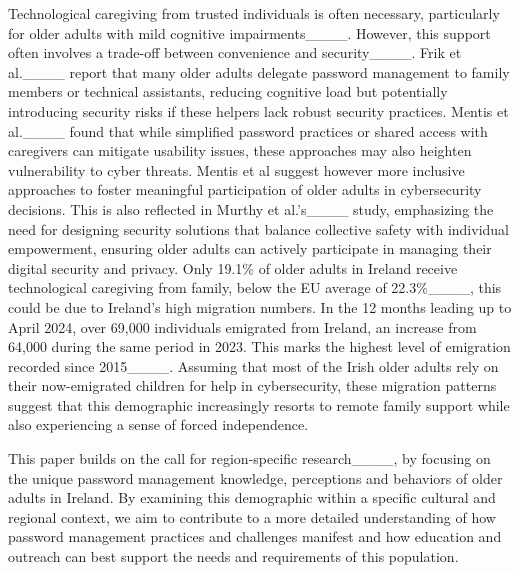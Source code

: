 Technological caregiving from trusted individuals is often necessary, particularly for older adults with mild cognitive impairments____. However, this support often involves a trade-off between convenience and security____. Frik et al.____ report that many older adults delegate password management to family members or technical assistants, reducing cognitive load but potentially introducing security risks if these helpers lack robust security practices. Mentis et al.____ found that while simplified password practices or shared access with caregivers can mitigate usability issues, these approaches may also heighten vulnerability to cyber threats. Mentis et al suggest however more inclusive approaches to foster meaningful participation of older adults in cybersecurity decisions. This is also reflected in Murthy et al.'s____ study, emphasizing the need for designing security solutions that balance collective safety with individual empowerment, ensuring older adults can actively participate in managing their digital security and privacy. %
Only 19.1\% of older adults in Ireland receive technological caregiving from family, below the EU average of 22.3\%____, this could be due to Ireland's high migration numbers.
In the 12 months leading up to April 2024, over 69,000 individuals emigrated from Ireland, an increase from 64,000 during the same period in 2023. This marks the highest level of emigration recorded since 2015____. Assuming that most of the Irish older adults rely on their now-emigrated children for help in cybersecurity, these migration patterns suggest that this demographic increasingly resorts to remote family support while also experiencing a sense of forced independence.


This paper builds on the call for region-specific research____, by focusing on the unique password management knowledge, perceptions and behaviors of older adults in Ireland. By examining this demographic within a specific cultural and regional context, we aim to contribute to a more detailed understanding of how password management practices and challenges manifest and how education and outreach can best support the needs and requirements of this population. %
